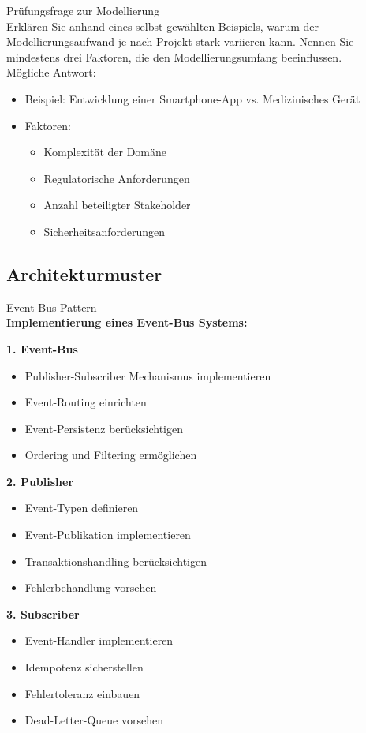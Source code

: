 \begin{example2}[breakable]{Prüfungsfrage zur Modellierung}\\
Erklären Sie anhand eines selbst gewählten Beispiels, warum der Modellierungsaufwand je nach Projekt stark variieren kann. Nennen Sie mindestens drei Faktoren, die den Modellierungsumfang beeinflussen.
\vspace{3mm}\\
Mögliche Antwort:
\begin{itemize}
    \item Beispiel: Entwicklung einer Smartphone-App vs. Medizinisches Gerät
    \item Faktoren:
    \begin{itemize}
        \item Komplexität der Domäne
        \item Regulatorische Anforderungen
        \item Anzahl beteiligter Stakeholder
        \item Sicherheitsanforderungen
    \end{itemize}
\end{itemize}
\end{example2}

\subsection{Architekturmuster}

\begin{KR}{Event-Bus Pattern}\\
\textbf{Implementierung eines Event-Bus Systems:}

\textbf{1. Event-Bus}

\begin{itemize}
    \item Publisher-Subscriber Mechanismus implementieren
    \item Event-Routing einrichten
    \item Event-Persistenz berücksichtigen
    \item Ordering und Filtering ermöglichen
\end{itemize}

\textbf{2. Publisher}

\begin{itemize}
    \item Event-Typen definieren
    \item Event-Publikation implementieren
    \item Transaktionshandling berücksichtigen
    \item Fehlerbehandlung vorsehen
\end{itemize}

\textbf{3. Subscriber}

\begin{itemize}
    \item Event-Handler implementieren
    \item Idempotenz sicherstellen
    \item Fehlertoleranz einbauen
    \item Dead-Letter-Queue vorsehen
\end{itemize}
\end{KR}

